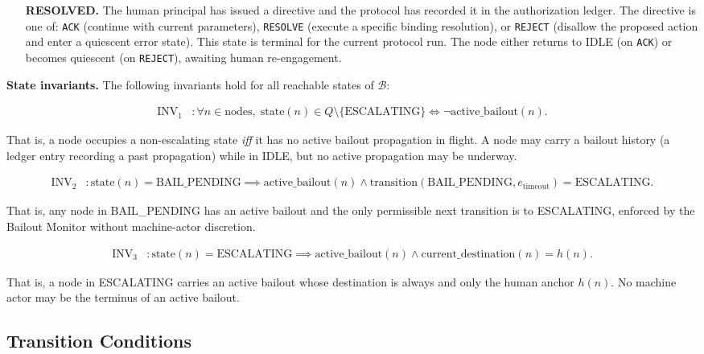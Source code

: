 \begin{itemize}
\item[\textbf{RESOLVED.}] The human principal has issued a directive and the protocol has recorded it in the authorization ledger. The directive is one of: \texttt{ACK} (continue with current parameters), \texttt{RESOLVE} (execute a specific binding resolution), or \texttt{REJECT} (disallow the proposed action and enter a quiescent error state). This state is terminal for the current protocol run. The node either returns to IDLE (on \texttt{ACK}) or becomes quiescent (on \texttt{REJECT}), awaiting human re-engagement.
\end{itemize}

\bigskip
\noindent\textbf{State invariants.} The following invariants hold for all reachable states of $\mathcal{B}$:

\begin{align}
\text{INV}_1 &: \forall n \in \text{nodes},\; \text{state}(n) \in Q \setminus \{\text{ESCALATING}\} \iff \neg\text{active\_bailout}(n). \tag{INV-1}
\end{align}

That is, a node occupies a non-escalating state \emph{iff} it has no active bailout propagation in flight. A node may carry a bailout history (a ledger entry recording a past propagation) while in IDLE, but no active propagation may be underway.

\begin{align}
\text{INV}_2 &: \text{state}(n) = \text{BAIL\_PENDING} \implies \text{active\_bailout}(n) \land \text{transition}(\text{BAIL\_PENDING}, e_{\text{timeout}}) = \text{ESCALATING}. \tag{INV-2}
\end{align}

That is, any node in BAIL\_PENDING has an active bailout and the only permissible next transition is to ESCALATING, enforced by the Bailout Monitor without machine-actor discretion.

\begin{align}
\text{INV}_3 &: \text{state}(n) = \text{ESCALATING} \implies \text{active\_bailout}(n) \land \text{current\_destination}(n) = h(n). \tag{INV-3}
\end{align}

That is, a node in ESCALATING carries an active bailout whose destination is always and only the human anchor $h(n)$. No machine actor may be the terminus of an active bailout.

\subsection{Transition Conditions}\label{sec:transitions}

